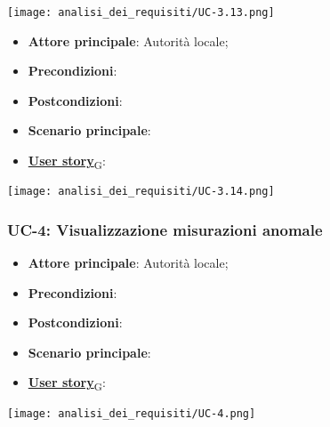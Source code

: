 \begin{center}
	\texttt{[image: analisi\_dei\_requisiti/UC-3.13.png]}
\end{center}

\begin{itemize}
	\item \textbf{Attore principale}: Autorità locale;
	\item \textbf{Precondizioni}:
	\item \textbf{Postcondizioni}:
	\item \textbf{Scenario principale}:
	\item \href{https://7last.github.io/docs/rtb/documentazione-interna/glossario\#user-story}{\textbf{User story}\textsubscript{G}}:
\end{itemize}

\begin{center}
	\texttt{[image: analisi\_dei\_requisiti/UC-3.14.png]}
\end{center}

\subsubsection{UC-4: Visualizzazione misurazioni anomale}
\begin{itemize}
	\item \textbf{Attore principale}: Autorità locale;
	\item \textbf{Precondizioni}:
	\item \textbf{Postcondizioni}:
	\item \textbf{Scenario principale}:
	\item \href{https://7last.github.io/docs/rtb/documentazione-interna/glossario\#user-story}{\textbf{User story}\textsubscript{G}}:
\end{itemize}

\begin{center}
	\texttt{[image: analisi\_dei\_requisiti/UC-4.png]}
\end{center}


